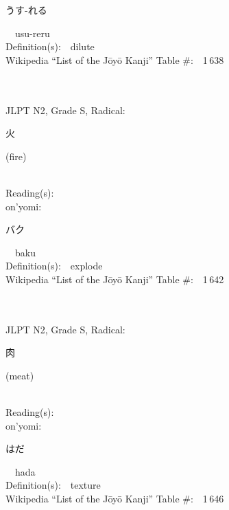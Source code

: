 \begin{multicols}{2}
{\hspace*{2em}}{\begin{CJK}{UTF8}{min} うす-れる \end{CJK}}\ \ usu-reru\ \ \\
Definition(s):\ \ dilute \\
Wikipedia ``List of the J\=oy\=o Kanji'' Table \#:\ \ 1\,638 \\
\ \ \\
{\fontsize{34pt}{40pt}  }\ \ \\  %
{JLPT N2, Grade S, Radical:\ \ {\begin{CJK}{UTF8}{min} 火 \end{CJK}} (fire) } \\
Reading(s):\ \ \\
{\hspace*{1em}}on'yomi:\ \ \\
{\hspace*{2em}}{\begin{CJK}{UTF8}{min} バク \end{CJK}}\ \ baku\ \ \\
Definition(s):\ \ explode \\
Wikipedia ``List of the J\=oy\=o Kanji'' Table \#:\ \ 1\,642 \\
\ \ \\
{\fontsize{34pt}{40pt}  }\ \ \\  %
{JLPT N2, Grade S, Radical:\ \ {\begin{CJK}{UTF8}{min} 肉 \end{CJK}} (meat) } \\
Reading(s):\ \ \\
{\hspace*{1em}}on'yomi:\ \ \\
{\hspace*{2em}}{\begin{CJK}{UTF8}{min} はだ \end{CJK}}\ \ hada\ \ \\
Definition(s):\ \ texture \\
Wikipedia ``List of the J\=oy\=o Kanji'' Table \#:\ \ 1\,646 \\
\ \ \\

\end{multicols}
